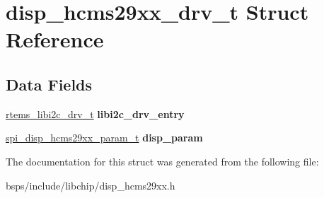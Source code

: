 \hypertarget{structdisp__hcms29xx__drv__t}{}\section{disp\+\_\+hcms29xx\+\_\+drv\+\_\+t Struct Reference}
\label{structdisp__hcms29xx__drv__t}
\subsection*{Data Fields}
\begin{DoxyCompactItemize}
\item 
\mbox{\label{structdisp__hcms29xx__drv__t_af14194b22ee518f8dd7f71c8b7f56c85}} 
\mbox{\hyperlink{structrtems__libi2c__drv__t__}{rtems\+\_\+libi2c\+\_\+drv\+\_\+t}} {\bfseries libi2c\+\_\+drv\+\_\+entry}
\item 
\mbox{\label{structdisp__hcms29xx__drv__t_a752d060ecf6f791339dd1f95bef3d08b}} 
\mbox{\hyperlink{structspi__disp__hcms29xx__param__t}{spi\+\_\+disp\+\_\+hcms29xx\+\_\+param\+\_\+t}} {\bfseries disp\+\_\+param}
\end{DoxyCompactItemize}


The documentation for this struct was generated from the following file\+:\begin{DoxyCompactItemize}
\item 
bsps/include/libchip/disp\+\_\+hcms29xx.\+h\end{DoxyCompactItemize}
